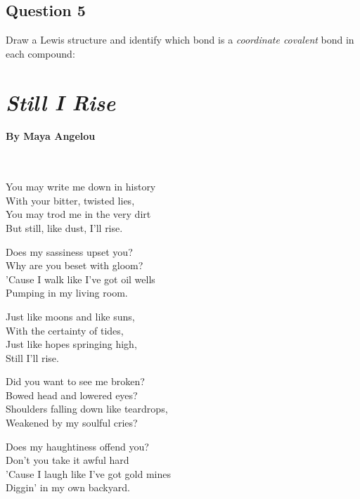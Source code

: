 \documentclass[11pt, letterpaper]{memoir}
\begin{document}
{\subsection*{Question 5}
Draw a Lewis structure and identify which bond is a \emph{coordinate covalent} bond in each compound:

{\large {} \hspace{10em}  \hspace{10em} }



\newpage
{}
\pagestyle{empty}
\addtocounter{page}{-1}
\section*{\emph{Still I Rise}}
\paragraph{By Maya Angelou}~

\vspace{1em}
\begin{minipage}[t]{0.49\linewidth}
	
	You may write me down in history\\
	With your bitter, twisted lies,\\
	You may trod me in the very dirt\\
	But still, like dust, I'll rise.
	
	Does my sassiness upset you?\\
	Why are you beset with gloom?\\
	’Cause I walk like I've got oil wells\\
	Pumping in my living room.
	
	Just like moons and like suns,\\
	With the certainty of tides,\\
	Just like hopes springing high,\\
	Still I'll rise.
	
	Did you want to see me broken?\\
	Bowed head and lowered eyes?\\
	Shoulders falling down like teardrops,\\
	Weakened by my soulful cries?
	
	Does my haughtiness offend you?\\
	Don't you take it awful hard\\
	’Cause I laugh like I've got gold mines\\
	Diggin’ in my own backyard.
	

\end{minipage}}
\end{document}

